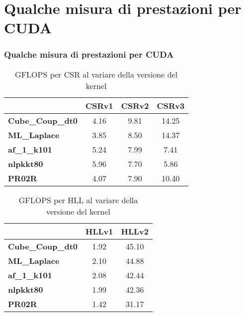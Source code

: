 \documentclass{beamer}
\begin{document}
\section{Qualche misura di prestazioni per CUDA}
\begin{frame}
    \frametitle{Qualche misura di prestazioni per CUDA}
    
    \begin{table}
    \centering
    \begin{tabular}{| l | c | c | c |}
    \hline
    & \textbf{CSRv1} & \textbf{CSRv2} & \textbf{CSRv3} \\
    \hline
    \hline
    \textbf{Cube\_Coup\_dt0} & 4.16 & 9.81 & 14.25 \\
    \textbf{ML\_Laplace} & 3.85 & 8.50 & 14.37 \\
    \textbf{af\_1\_k101} & 5.24 & 7.99 & 7.41 \\
    \textbf{nlpkkt80} & 5.96 & 7.70 & 5.86 \\
    \textbf{PR02R} & 4.07 & 7.90 & 10.40 \\
    \hline
    \end{tabular}
    \caption{GFLOPS per CSR al variare della versione del kernel}
    \end{table}
 
    \begin{table}
    \centering
    \begin{tabular}{| l | c | c |}
    \hline
    & \textbf{HLLv1} & \textbf{HLLv2} \\
    \hline
    \hline
    \textbf{Cube\_Coup\_dt0} & 1.92 & 45.10 \\
    \textbf{ML\_Laplace} & 2.10 & 44.88 \\
    \textbf{af\_1\_k101} & 2.08 & 42.44 \\
    \textbf{nlpkkt80} & 1.99 & 42.36 \\
    \textbf{PR02R} & 1.42 & 31.17 \\
    \hline
    \end{tabular}
    \caption{GFLOPS per HLL al variare della versione del kernel}
    \end{table}
    
\end{frame}
\end{document}
